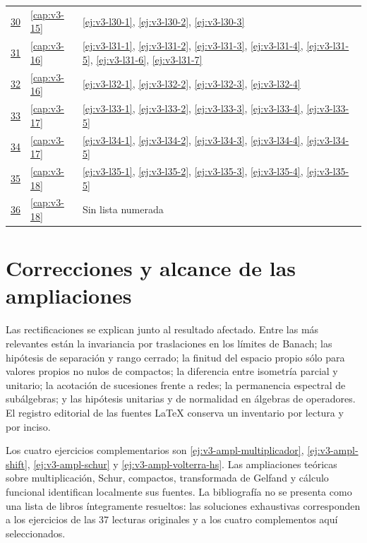 {\begin{longtable}{@{}p{}p{}p{}@{}}
\href{https://drive.google.com/file/d/1NVYh7BZXDsZLtK5Zn20vKHiH83EHPu-1/view?usp=drivesdk}{30} & \ref{cap:v3-15} & \ref{ej:v3-l30-1}, \ref{ej:v3-l30-2}, \ref{ej:v3-l30-3} \\
\href{https://drive.google.com/file/d/1-CZ8tKOFYmfHwrh403S7I1wabpj0G3XQ/view?usp=drivesdk}{31} & \ref{cap:v3-16} & \ref{ej:v3-l31-1}, \ref{ej:v3-l31-2}, \ref{ej:v3-l31-3}, \ref{ej:v3-l31-4}, \ref{ej:v3-l31-5}, \ref{ej:v3-l31-6}, \ref{ej:v3-l31-7} \\
\href{https://drive.google.com/file/d/1_sxkJzocq0DpUMTMRhsIIgIe0zeoszfZ/view?usp=drivesdk}{32} & \ref{cap:v3-16} & \ref{ej:v3-l32-1}, \ref{ej:v3-l32-2}, \ref{ej:v3-l32-3}, \ref{ej:v3-l32-4} \\
\href{https://drive.google.com/file/d/1xCLnQjTJyHNOUwUSBlZZOpPIrwZabo1y/view?usp=drivesdk}{33} & \ref{cap:v3-17} & \ref{ej:v3-l33-1}, \ref{ej:v3-l33-2}, \ref{ej:v3-l33-3}, \ref{ej:v3-l33-4}, \ref{ej:v3-l33-5} \\
\href{https://drive.google.com/file/d/1REow0O9H83TqCRrPk-PvOBaTOCSt2CXP/view?usp=drivesdk}{34} & \ref{cap:v3-17} & \ref{ej:v3-l34-1}, \ref{ej:v3-l34-2}, \ref{ej:v3-l34-3}, \ref{ej:v3-l34-4}, \ref{ej:v3-l34-5} \\
\href{https://drive.google.com/file/d/1-_gQL5WkSQhrzzkTmn8O5P4HnH8SthjJ/view?usp=drivesdk}{35} & \ref{cap:v3-18} & \ref{ej:v3-l35-1}, \ref{ej:v3-l35-2}, \ref{ej:v3-l35-3}, \ref{ej:v3-l35-4}, \ref{ej:v3-l35-5} \\
\href{https://drive.google.com/file/d/1onnQ2VXL8VjgA58PqQtQZ_6fczu2IBU1/view?usp=drivesdk}{36} & \ref{cap:v3-18} & Sin lista numerada \\
\bottomrule
\end{longtable}}

\section*{Correcciones y alcance de las ampliaciones}
Las rectificaciones se explican junto al resultado afectado. Entre las más relevantes están la invariancia por traslaciones en los límites de Banach; las hipótesis de separación y rango cerrado; la finitud del espacio propio sólo para valores propios no nulos de compactos; la diferencia entre isometría parcial y unitario; la acotación de sucesiones frente a redes; la permanencia espectral de subálgebras; y las hipótesis unitarias y de normalidad en álgebras de operadores. El registro editorial de las fuentes LaTeX conserva un inventario por lectura y por inciso.

Los cuatro ejercicios complementarios son \ref{ej:v3-ampl-multiplicador}, \ref{ej:v3-ampl-shift}, \ref{ej:v3-ampl-schur} y \ref{ej:v3-ampl-volterra-hs}. Las ampliaciones teóricas sobre multiplicación, Schur, compactos, transformada de Gelfand y cálculo funcional identifican localmente sus fuentes. La bibliografía no se presenta como una lista de libros íntegramente resueltos: las soluciones exhaustivas corresponden a los ejercicios de las 37 lecturas originales y a los cuatro complementos aquí seleccionados.
